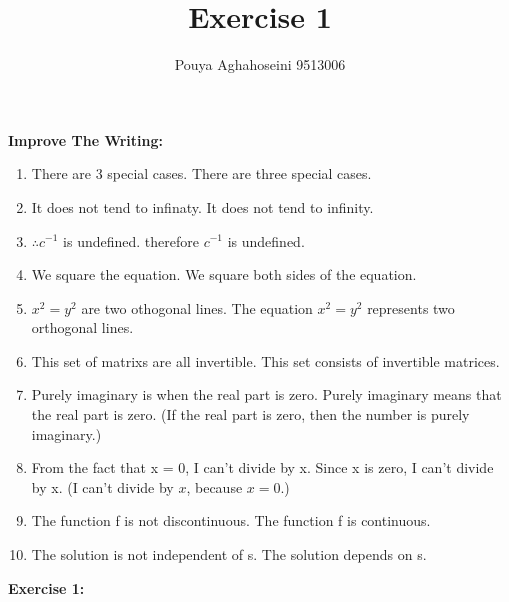 \documentclass[11pt]{article}
\begin{document}
\author{Pouya Aghahoseini 9513006}
\title{Exercise 1}
\maketitle

\medskip
	{\textbf{\huge Improve The Writing:}}
\begin{enumerate}
\item
There are 3 special cases. \textrightarrow \hspace*{0.25cm}  There are three special cases.
\item
It does not tend to infinaty. \textrightarrow \hspace*{0.25cm} It does not tend to infinity.
\item
$\therefore c^{-1}$ is undefined. \textrightarrow \hspace*{0.25cm} therefore $c^{-1}$ is undefined.
\item
We square the equation. \textrightarrow \hspace*{0.25cm} We square both sides of the equation. 
\item
$x^{2} = y^{2}$ are two othogonal lines. \textrightarrow \hspace*{0.25cm} The equation $x^{2}=y^{2}$ represents two orthogonal lines. 
\item
This set of matrixs are all invertible. \textrightarrow \hspace*{0.25cm} This set consists of invertible matrices.
\item
Purely imaginary is when the real part is zero. \textrightarrow \hspace*{0.25cm} Purely imaginary means that the real part is zero. (If the real part is zero, then the number is purely imaginary.)
\item
From the fact that x = 0, I can't divide by x. \textrightarrow \hspace*{0.25cm} Since x is zero, I can’t divide by x. (I can't divide by $x$, because $x=0$.)
\item
The function f is not discontinuous. \textrightarrow \hspace*{0.25cm} The function f is continuous.
\item
The solution is not independent of s. \textrightarrow \hspace*{0.25cm} The solution depends on s.
\end{enumerate}
\textbf{\huge Exercise 1:}\\
\end{document}
